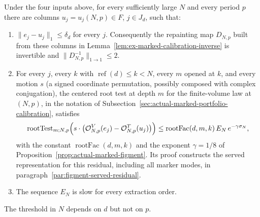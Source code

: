 \begin{proposition}
\label{prop:ex-marked-solaris}
Under the four inputs above, for every sufficiently large $N$ and every
period $p$ there are columns $u_j=u_j(N,p)\in F$, $j\in J_d$, such that:
\begin{enumerate}
\item $\|e_j-u_j\|_1\leq\delta_d$ for every $j$. Consequently the
  repainting map $D_{N,p}$ built from these columns in
  Lemma~\ref{lem:ex-marked-calibration-inverse} is invertible and
  $\|D_{N,p}^{-1}\|_{1\to1}\leq2$.
\item For every $j$, every $k$ with $\operatorname{ref}(d)\leq k<N$,
  every $m$ opened at $k$, and every motion $s$ (a signed
  coordinate permutation, possibly composed with complex conjugation),
  the centered root test at depth $m$ for the finite-volume law at
  $(N,p)$, in the notation of
  Subsection~\ref{sec:actual-marked-portfolio-calibration}, satisfies
  \[
   \operatorname{rootTest}_{m;N,p}\Bigl(
      s\cdot\bigl(\mathcal O^{V}_{N,p}(e_j)
                  -\mathcal O^{T}_{N,p}(u_j)\bigr)\Bigr)
     \leq\operatorname{rootFac}(d,m,k)\,E_N\,
          e^{-\gamma\sigma_N},
  \]
  with the constant $\operatorname{rootFac}(d,m,k)$ and the exponent
  $\gamma=1/8$ of Proposition~\ref{prop:actual-marked-figment}. Its
  proof constructs the served representation for this residual, including
  all marker modes, in paragraph~\ref{par:figment-served-residual}.
\item The sequence $E_N$ is slow for every extraction order.
\end{enumerate}
The threshold in $N$ depends on $d$ but not on $p$.
\end{proposition}
